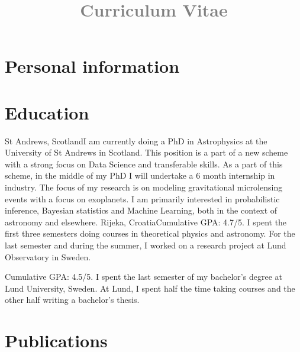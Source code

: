 \documentclass[11pt,a4paper,roman]{moderncv}
\title{\textcolor{gray}{ Curriculum Vitae}}
\begin{document}
\makecvtitle
\section{Personal information}
\section{Education}
{St Andrews, Scotland}{}{I am currently doing a PhD in Astrophysics at the University
of St Andrews in Scotland. This position is a part of a new scheme with a strong 
focus on Data Science and transferable skills. As a part of this scheme, in the middle
of my PhD I will undertake a 6 month internship in industry. The focus of my research
is on modeling gravitational microlensing events with a focus on exoplanets. I am 
primarily interested in probabilistic inference, Bayesian statistics and Machine 
Learning, both in the context of astronomy and elsewhere.}
{Rijeka, Croatia}{}{Cumulative GPA: 4.7/5. I spent the first three semesters 
doing courses in theoretical 
physics and astronomy. For the last semester and during the summer, I worked on 
a research project at Lund Observatory in Sweden.}

{Cumulative GPA: 4.5/5. I spent the last semester of my bachelor's degree at
Lund University, Sweden. At Lund, I spent half the time taking courses and the other
half writing a bachelor's thesis.}

\section{Publications}
\end{document}

